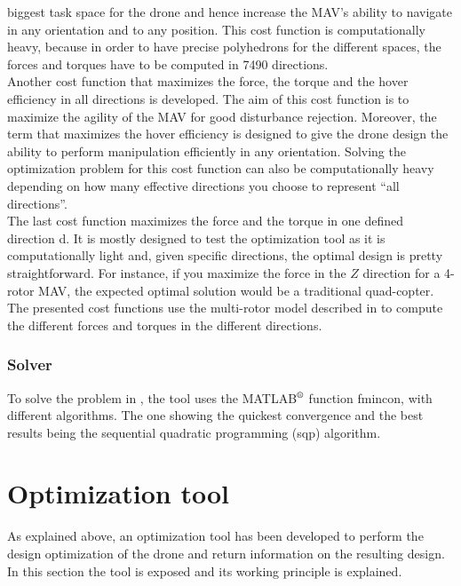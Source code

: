 biggest task space for the drone and hence increase the MAV’s ability to navigate
in any orientation and to any position. This cost function is computationally heavy,
because in order to have precise polyhedrons for the different spaces, the forces and
torques have to be computed in 7490 directions.\\
Another cost function that maximizes the force, the torque and the hover
efficiency in all directions is developed. The aim of this cost function
is to maximize the agility of the MAV for good disturbance rejection. Moreover,
the term that maximizes the hover efficiency is designed to give the drone design
the ability to perform manipulation efficiently in any orientation. Solving the
optimization problem for this cost function can also be computationally heavy
depending on how many effective directions you choose to represent “all directions”.\\
The last cost function maximizes the force and the torque in one defined
direction d. It is mostly designed to test the optimization tool as it is
computationally light and, given specific directions, the optimal design is
pretty straightforward. For instance, if you maximize the force in the $Z$
direction for a 4-rotor MAV, the expected optimal solution would be a traditional
quad-copter.
The presented cost functions use the multi-rotor model described in
 to compute the different forces and torques in the
different directions.

\subsubsection{Solver}
\label{sec:solver}
To solve the problem in , the tool uses the
MATLAB$^\textrm{\textregistered}$ function fmincon, with different algorithms.
The one showing the quickest convergence and the best results being the sequential
quadratic programming (sqp) algorithm.

\section{Optimization tool}
\label{sec:optimization_tool}
As explained above, an optimization tool has been developed to perform
the design optimization of the drone and return information on the resulting design.
In this section the tool is exposed and its working principle is explained.
